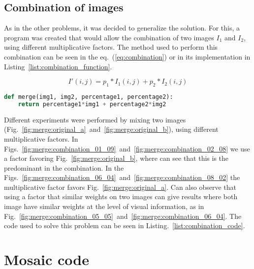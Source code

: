 \documentclass[journal]{IEEEtran}
\begin{document}
\subsection{Combination of images}
As in the other problems, it was decided to generalize the solution. For this, a program was created that would allow the combination of two images $I_1$ and $I_2$, using different multiplicative factors. The method used to perform this combination can be seen in the eq.~(\ref{eq:combination}) or in its implementation in Listing~\ref{list:combination_function}.

\begin{equation}\label{eq:combination}
I'(i,j) = p_1 * I_1(i, j) + p_2 * I_2(i, j)
\end{equation}

\begin{lstlisting}[language=Python, caption=Combination function, label=list:combination_function]
def merge(img1, img2, percentage1, percentage2):
	return percentage1*img1 + percentage2*img2
\end{lstlisting}

Different experiments were performed by mixing two images (Fig.~\ref{fig:merge:original_a}~and~\ref{fig:merge:original_b}), using different multiplicative factors. In Figs.~\ref{fig:merge:combination_01_09}~and~\ref{fig:merge:combination_02_08} we use a factor favoring Fig.~\ref{fig:merge:original_b}, where can see that this is the predominant in the combination. In the Figs.~\ref{fig:merge:combination_06_04}~and~\ref{fig:merge:combination_08_02} the multiplicative factor favors Fig.~\ref{fig:merge:original_a}. Can also observe that using a factor that similar weights on two images can give results where both image have similar weights at the level of visual information, as in Fig.~\ref{fig:merge:combination_05_05}~and~\ref{fig:merge:combination_06_04}. The code used to solve this problem can be seen in Listing.~\ref{list:combination_code}.


\appendices
\section{Mosaic code}
\end{document}
